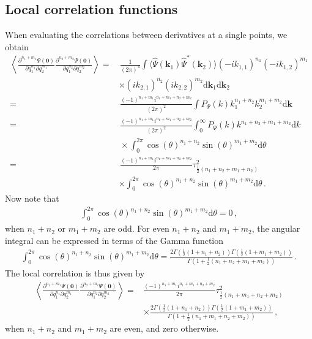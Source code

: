 \documentclass[a4paper, 11pt]{article}
\begin{document}
\subsection{Local correlation functions}
When evaluating the correlations between derivatives at a single points, we obtain
\begin{align}
\left\langle \frac{\partial^{n_1+m_1}\Psi(\bm{0})}{\partial q_1^{n_1}\partial q_2^{m_1}} \frac{\partial^{n_2+m_2}\Psi(\bm{0})}{\partial q_1^{n_2}\partial q_2^{m_2}}\right\rangle =&\,
\frac{1}{(2\pi)^4} \int  \langle \hat{\Psi}(\bm{k}_1)\hat{\Psi}^*(\bm{k}_2)\rangle (-i k_{1,1})^{n_1} (-i k_{1,2})^{m_1}\\
&\times(i k_{2,1})^{n_2} (i k_{2,2})^{m_2} \mathrm{d}\bm{k}_1 \mathrm{d}\bm{k}_2\nonumber\\
=&\,\frac{(-1)^{n_1+m_1}i^{n_1+m_1+n_2+m_2}}{(2\pi)^2} \int  P_\Psi(k)  k_{1}^{n_1+n_2}  k_{2}^{m_1+m_2} \mathrm{d}\bm{k}\nonumber\\
=&\,\frac{(-1)^{n_1+m_1}i^{n_1+m_1+n_2+m_2}}{(2\pi)^2} \int_0^\infty  P_\Psi(k)  k^{n_1+n_2+m_1+m_2} \mathrm{d} k\nonumber\\
&\,\times \int_0^{2\pi} \cos(\theta)^{n_1+n_2} \sin(\theta)^{m_1+m_2}\mathrm{d}\theta\nonumber\\
=&\,\frac{(-1)^{n_1+m_1}i^{n_1+m_1+n_2+m_2}}{2\pi} \tau^2_{\frac{1}{2}(n_1+n_2+m_1+n_2)}\nonumber\\
&\times \int_0^{2\pi} \cos(\theta)^{n_1+n_2} \sin(\theta)^{m_1+m_2}\mathrm{d}\theta\,.
\end{align}
Now note that
\begin{align}
\int_0^{2\pi} \cos(\theta)^{n_1+n_2} \sin(\theta)^{m_1+m_2}\mathrm{d}\theta = 0\,,
\end{align}
when $n_1+n_2$ or $m_1+m_2$ are odd. For even $n_1+n_2$ and $m_1+m_2$, the angular integral can be expressed in terms of the Gamma function
\begin{align}
\int_0^{2\pi} \cos(\theta)^{n_1+n_2} \sin(\theta)^{m_1+m_2}\mathrm{d}\theta = 
\frac{2 \Gamma\left(\frac{1}{2}(1+n_1+n_2)\right)\Gamma\left(\frac{1}{2}(1+m_1+m_2)\right)}{\Gamma\left(1+\frac{1}{2}(n_1+n_2+m_1+m_2)\right)}\,.
\end{align}
The local correlation is thus given by
\begin{align}
\left\langle \frac{\partial^{n_1+m_1}\Psi(\bm{0})}{\partial q_1^{n_1}\partial q_2^{m_1}} \frac{\partial^{n_2+m_2}\Psi(\bm{0})}{\partial q_1^{n_2}\partial q_2^{m_2}}\right\rangle 
=&\frac{(-1)^{n_1+m_1}i^{n_1+m_1+n_2+m_2}}{2\pi} \tau^2_{\frac{1}{2}(n_1+m_1+n_2+m_2)}\nonumber\\
&\times 
\frac{2 \Gamma\left(\frac{1}{2}(1+n_1+n_2)\right)\Gamma\left(\frac{1}{2}(1+m_1+m_2)\right)}{\Gamma\left(1+\frac{1}{2}(n_1+m_1+n_2+m_2)\right)}\,,
\end{align}
when $n_1+n_2$ and $m_1+m_2$ are even, and zero otherwise.
\end{document}
